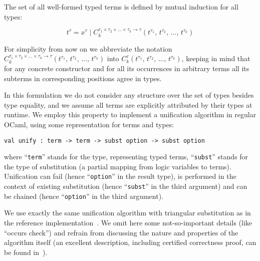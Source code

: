 The set of all well-formed typed terms is defined by mutual induction for all types:

$$
t^\tau=x^\tau\mid C_k^{\tau_1\times\tau_2\times\dots\times\tau_k\to\tau}(t^{\tau_1},\,t^{\tau_2},\,\dots,\,t^{\tau_k})
$$

For simplicity from now on we abbreviate the notation $C_k^{\tau_1\times\tau_2\times\dots\times\tau_k\to\tau}(t^{\tau_1},\,t^{\tau_2},\,\dots,\,t^{\tau_k})$ into
$C_k^\tau(t^{\tau_1},\,t^{\tau_2},\,\dots,\,t^{\tau_k})$, keeping in mind that for any concrete constructor and for all its occurrences
in arbitrary terms all its subterms in corresponding positions agree in types.

\begin{comment}
We need also to define the notion of a subterm  $t^\tau[p]$ of a term $t^\tau$ at given position $p$:

$$
\begin{array}{rcl}
 p=\epsilon\mid\{1, 2, 3,\dots\}\bullet p&-&\mbox{the set of positions}\\
 t^\tau[\epsilon]=t^\tau&-&\mbox{base case}\\
 C_k^\tau(t_1^{\tau_1},\,t_2^{\tau_2},\dots,\,t_k^{\tau_k})[i\bullet p]=t_i^{\tau_i}[p], 1\le i \le k&-&\mbox{inductive case}
\end{array}
$$
\end{comment}

In this formulation we do not consider any structure over the set of types besides type equality, and we assume all terms are explicitly
attributed by their types at runtime. We employ this property to implement a unification algorithm in regular OCaml, using some
representation for terms and types:

\begin{lstlisting}[mathescape=true]
    val unify : term -> term -> subst option -> subst option
\end{lstlisting}

\noindent where ``\lstinline{term}'' stands for the type, representing typed terms, ``\lstinline{subst}'' stands for the type of
substitution (a partial mapping from logic variables to terms). Unification can fail (hence ``\lstinline{option}'' in the result type),
is performed in the context of existing substitution (hence ``\lstinline{subst}'' in the third argument) and can be
chained (hence ``\lstinline{option}'' in the third argument).

We use exactly the same unification algorithm with triangular substitution as in the reference implementation~\cite{MicroKanren}. We
omit here some not-so-important details (like ``occurs check'') and refrain from discussing the nature and properties of the algorithm
itself (an excellent description, including certified correctness proof, can be found in~\cite{Kumar}).


